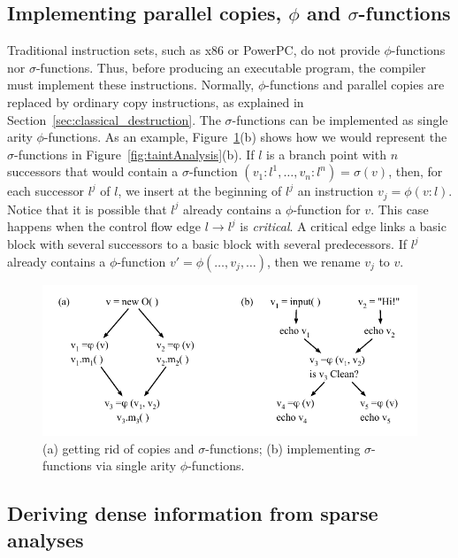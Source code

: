 \subsection{Implementing parallel copies, $\phi$ and $\sigma$-functions}
\label{sub:special}
Traditional instruction sets, such as x86 or PowerPC, do not provide $\phi$-functions nor $\sigma$-functions.
Thus, before producing an executable program, the compiler must implement these instructions.
Normally, $\phi$-functions and parallel copies are replaced by ordinary copy instructions, as explained in Section~\ref{sec:classical_destruction}.
The $\sigma$-functions can be implemented as single arity $\phi$-functions.
As an example, Figure~\ref{fig:sigImpl}(b) shows how we would represent the $\sigma$-functions in Figure~\ref{fig:taintAnalysis}(b).
If $l$ is a branch point with $n$ successors that would contain a $\sigma$-function $(v_1:l^1, \ldots, v_n:l^n) =\sigma(v)$, then, for each successor $l^j$ of $l$, we insert at the beginning of $l^j$ an instruction $v_j = \phi(v:l)$.
Notice that it is possible that $l^j$ already contains a $\phi$-function for $v$.
This case happens when the control flow edge $l \rightarrow l^j$ is {\em critical}.
A critical edge links a basic block with several successors to a basic block with several predecessors.
If $l^j$ already contains a $\phi$-function $v' = \phi(\ldots, v_j, \ldots)$, then we rename $v_j$ to $v$.


\begin{figure}[t!]
\centering
\includegraphics[scale=0.9]{sigImpl}
\caption{(a) getting rid of copies and $\sigma$-functions; (b) implementing $\sigma$-functions via single arity $\phi$-functions.}
\label{fig:sigImpl}
\end{figure}


\subsection{Deriving dense information from sparse analyses}
\label{sub:dense}

